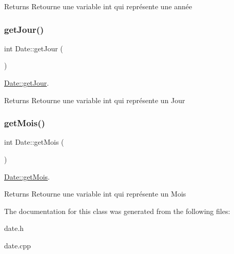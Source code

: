 \begin{DoxyReturn}{Returns}
Retourne une variable int qui représente une année 
\end{DoxyReturn}
\mbox{\label{class_date_a961e64bff2fdff7ee95bc335ca400d2f}} 
\subsubsection{\texorpdfstring{get\+Jour()}{getJour()}}
{\footnotesize\ttfamily int Date\+::get\+Jour (\begin{DoxyParamCaption}{ }\end{DoxyParamCaption})}



\hyperlink{class_date_a961e64bff2fdff7ee95bc335ca400d2f}{Date\+::get\+Jour}. 

\begin{DoxyReturn}{Returns}
Retourne une variable int qui représente un Jour 
\end{DoxyReturn}
\mbox{\label{class_date_a6b16211abaa2c22418e82b8cd9d08bfe}} 
\subsubsection{\texorpdfstring{get\+Mois()}{getMois()}}
{\footnotesize\ttfamily int Date\+::get\+Mois (\begin{DoxyParamCaption}{ }\end{DoxyParamCaption})}



\hyperlink{class_date_a6b16211abaa2c22418e82b8cd9d08bfe}{Date\+::get\+Mois}. 

\begin{DoxyReturn}{Returns}
Retourne une variable int qui représente un Mois 
\end{DoxyReturn}


The documentation for this class was generated from the following files\+:\begin{DoxyCompactItemize}
\item 
date.\+h\item 
date.\+cpp\end{DoxyCompactItemize}
